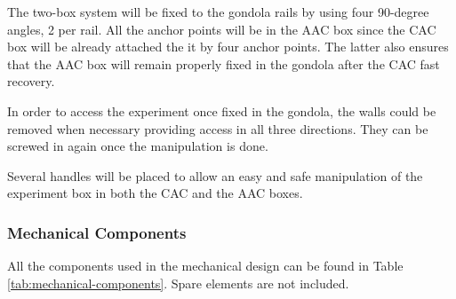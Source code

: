 The two-box system will be fixed to the gondola rails by using four 90-degree angles, 2 per rail. All the anchor points will be in the AAC box since the CAC box will be already attached the it by four anchor points. The latter also ensures that the AAC box will remain properly fixed in the gondola after the CAC fast recovery. 

\smallskip
In order to access the experiment once fixed in the gondola, the walls could be removed when necessary providing access in all three directions. They can be screwed in again once the manipulation is done.


Several handles will be placed to allow an easy and safe manipulation of the experiment box in both the CAC and the AAC boxes. 


\subsubsection{Mechanical Components}

All the components used in the mechanical design can be found in Table \ref{tab:mechanical-components}. Spare elements are not included. 


\raggedbottom